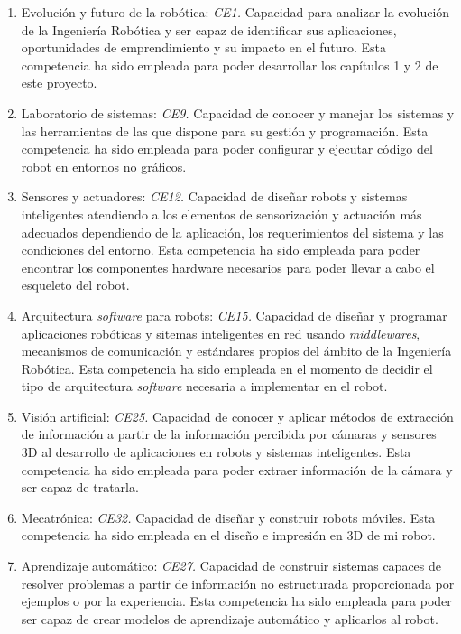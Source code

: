 \begin{enumerate}
	\item{Evolución y futuro de la robótica: \textit{CE1.} Capacidad para analizar la evolución de la Ingeniería Robótica y ser capaz de identificar sus aplicaciones, oportunidades de emprendimiento y su impacto en el futuro. 
	Esta competencia ha sido empleada para poder desarrollar los capítulos 1 y 2 de este proyecto.}
	\item{Laboratorio de sistemas: \textit{CE9.} Capacidad de conocer y manejar los sistemas y las herramientas de las que dispone para su gestión y programación. 
	Esta competencia ha sido empleada para poder configurar y ejecutar código del robot en entornos no gráficos.}
	\item{Sensores y actuadores: \textit{CE12.} Capacidad de diseñar robots y sistemas inteligentes atendiendo a los elementos de sensorización y actuación más adecuados dependiendo de la aplicación, los requerimientos del sistema y las condiciones del entorno. 
	Esta competencia ha sido empleada para poder encontrar los componentes hardware necesarios para poder llevar a cabo el esqueleto del robot.}
	\item{Arquitectura \textit{software} para robots: \textit{CE15.} Capacidad de diseñar y programar aplicaciones robóticas y sitemas inteligentes en red usando \textit{middlewares}, mecanismos de comunicación y estándares propios del ámbito de la Ingeniería Robótica. 
	Esta competencia ha sido empleada en el momento de decidir el tipo de arquitectura \textit{software} necesaria a implementar en el robot.}
	\item{Visión artificial: \textit{CE25.} Capacidad de conocer y aplicar métodos de extracción de información a partir de la información percibida por cámaras y sensores 3D al desarrollo de aplicaciones en robots y sistemas inteligentes. 
	Esta competencia ha sido empleada para poder extraer información de la cámara y ser capaz de tratarla.}
	\item{Mecatrónica: \textit{CE32.} Capacidad de diseñar y construir robots móviles. Esta competencia ha sido empleada en el diseño e impresión en 3D de mi robot.}
	\item{Aprendizaje automático: \textit{CE27.} Capacidad de construir sistemas capaces de resolver problemas a partir de información no estructurada proporcionada por ejemplos o por la experiencia. 
	Esta competencia ha sido empleada para poder ser capaz de crear modelos de aprendizaje automático y aplicarlos al robot.}
\end{enumerate}


